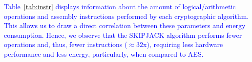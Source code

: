 \documentclass[journal]{IEEEtran}
\newcommand{\rever}{\textcolor{blue}}
\newcommand{\refazer}[1]{{\color{red}{[#1]}}}
\begin{document}

\rever{Table~\ref{tab:instr} displays information about the amount of logical/arithmetic operations and assembly instructions performed by each cryptographic algorithm. This allows us to draw a direct correlation between these parameters and energy consumption. Hence, we observe that the SKIPJACK algorithm performs fewer operations and, thus, fewer instructions ($\approx 32$x), requiring less hardware performance and less energy, particularly, when compared to AES.
}
\end{document}
